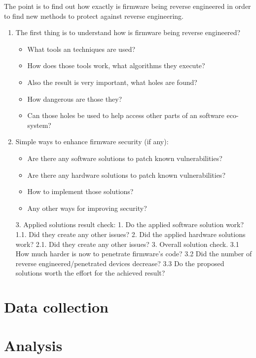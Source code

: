 \documentclass[]{report}
\begin{document}
The point is to find out how exactly is firmware being reverse engineered in order to find new methods to protect against reverse engineering.
\begin{enumerate}
	\item The first thing is to understand how is firmware being reverse engineered? 
 	\begin{itemize}
 	\item What tools an techniques are used? 
 	\item How does those tools work, what algorithms they execute? 
 	\item Also the result is very important, what holes are found? 
 	\item How dangerous are those they? 
 	\item Can those holes be used to help access other parts of an software eco-system?
 	\end{itemize}

	\item Simple ways to enhance firmware security (if any):
	\begin{itemize}
	\item Are there any software solutions to patch known vulnerabilities?
	\item Are there any hardware solutions to patch known vulnerabilities?
	\item How to implement those solutions?
	\item Any other ways for improving security?
\end{itemize}
3. Applied solutions result check:
1. Do the applied software solution work?
1.1. Did they create any other issues?
2. Did the applied hardware solutions work?
2.1. Did they create any other issues?
3. Overall solution check.
3.1 How much harder is now to penetrate firmware's code?
3.2 Did the number of reverse engineered/penetrated devices decrease?
3.3 Do the proposed solutions worth the effort for the achieved result?
\end{enumerate}
\section{Data collection}
\section{Analysis}
\end{document}
